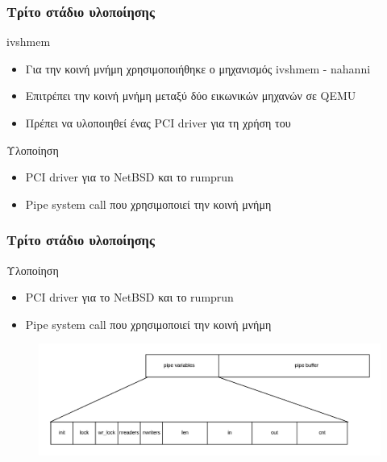 \documentclass[red,slidestop,notes,compress,mathserif]{beamer}
\begin{document}
\begin{frame}
\frametitle{Τρίτο στάδιο υλοποίησης}
\begin{block}{ivshmem}
\begin{itemize}
\item Για την κοινή μνήμη χρησιμοποιήθηκε ο μηχανισμός ivshmem - nahanni
\item Επιτρέπει την κοινή μνήμη μεταξύ δύο εικωνικών μηχανών σε QEMU
\item Πρέπει να υλοποιηθεί ένας PCI driver για τη χρήση του
\end{itemize}
\end{block}
\begin{block}{Υλοποίηση}
\begin{itemize}
\item PCI driver για το NetBSD και το rumprun
\item Pipe system call που χρησιμοποιεί την κοινή μνήμη
\end{itemize}
\end{block}
\end{frame}

\begin{frame}
\frametitle{Τρίτο στάδιο υλοποίησης}
\begin{block}{Υλοποίηση}
\begin{itemize}
\item PCI driver για το NetBSD και το rumprun
\item Pipe system call που χρησιμοποιεί την κοινή μνήμη
\end{itemize}
\end{block}
\begin{figure}
\center
\includegraphics[scale=0.66]{figures/shared_memoery_layout.png}
\end{figure}
\end{frame}
\end{document}
